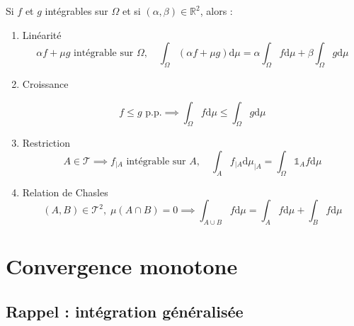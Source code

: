 \begin{Prop}{}{}
  Si $f$ et $g$ intégrables sur $\Omega$ et si $(\alpha, \beta) \in \mathbb{R} ^{2}$, alors : 
\begin{enumerate}


    \item Linéarité  
  \begin{equation}
    \alpha f+\mu g \text{ intégrable sur }\Omega,\quad \int_{\Omega}^{} (\alpha f + \mu g) \mathrm{d} \mu = \alpha \int_{\Omega}^{} f \mathrm{d} \mu + \beta \int_{\Omega}^{} g \mathrm{d}\mu
  \end{equation}
    \item Croissance  

      \begin{equation}
        f \le g \text{ p.p.} \implies \int_{\Omega}^{} f \mathrm{d}\mu \le \int_{\Omega}^{} g \mathrm{d}\mu
      \end{equation}

    \item Restriction 
      \begin{equation}
        A \in \mathcal{T} \implies f _{|A} \text{ intégrable sur } A, \quad \int_{A}^{} f _{|A}  \mathrm{d} \mu _{|A} = \int_{\Omega}^{} \mathbb{1} _A f \mathrm{d}\mu
      \end{equation}
    \item Relation de Chasles
      \begin{equation}
        (A, B) \in \mathcal{T} ^{2}, \; \mu(A \cap B) = 0 \implies \int_{A \cup B}^{} f \mathrm{d}\mu = \int_{A}^{} f \mathrm{d}\mu + \int_{B}^{} f \mathrm{d}\mu
      \end{equation}

\end{enumerate}
\end{Prop}













\newpage
\section{Convergence monotone} %
\label{sec:Convergence monotone}

\subsection{Rappel : intégration généralisée} %
\label{sub:Rappel : intégration généralisée}



